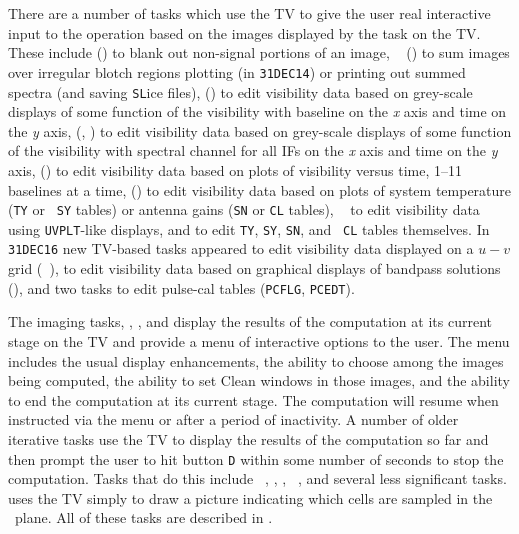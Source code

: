      There are a number of tasks which use the TV to give the user
real interactive input to the operation based on the images displayed
by the task on the TV\@.  These include {\tt {}}
() to blank out non-signal portions of an image, {\tt
{}} () to sum images over irregular blotch
regions plotting (in {\tt 31DEC14}) or printing out summed spectra
(and saving {\tt SL}ice files), {\tt {}} () to
edit visibility data based on grey-scale displays of some function of
the visibility with baseline on the {\it x\/} axis and time on the
{\it y\/} axis, {\tt {}} (, ) to
edit visibility data based on grey-scale displays of some function of
the visibility with spectral channel for all IFs on the {\it x\/} axis
and time on the {\it y\/} axis, {\tt {}} () to
edit visibility data based on plots of visibility versus time, 1--11
baselines at a time, {\tt {}} () to edit
visibility data based on plots of system temperature ({\tt TY} or {\tt
SY} tables) or antenna gains ({\tt SN} or {\tt CL} tables), {\tt
{}} to edit visibility data using {\tt UVPLT}-like displays,
and {\tt {}} to edit {\tt TY}, {\tt SY}, {\tt SN}, and {\tt
CL} tables themselves.  In {\tt 31DEC16} new TV-based tasks appeared
to edit visibility data displayed on a $u-v$ grid ({\tt
{}}), to edit visibility data based on graphical displays of
bandpass solutions ({\tt {}}), and two tasks to edit
pulse-cal tables ({\tt PCFLG}, {\tt PCEDT})\@.

     The imaging tasks, {\tt {}}, {\tt {}}, and
{\tt {}} display the results of the computation at its
current stage on the TV and provide a menu of interactive options to
the user.  The menu includes the usual display enhancements, the
ability to choose among the images being computed, the ability to set
Clean windows in those images, and the ability to end the computation
at its current stage.  The computation will resume when instructed via
the menu or after a period of inactivity.  A number of older iterative
tasks use the TV to display the results of the computation so far and
then prompt the user to hit button {\tt D} within some number of
seconds to stop the computation.  Tasks that do this include {\tt
{}}, {\tt {}}, {\tt {}}, {\tt
{}}, and several less significant tasks. {\tt {}}
uses the TV simply to draw a picture indicating which cells are
sampled in the \uv\ plane.  All of these tasks are described in
.


